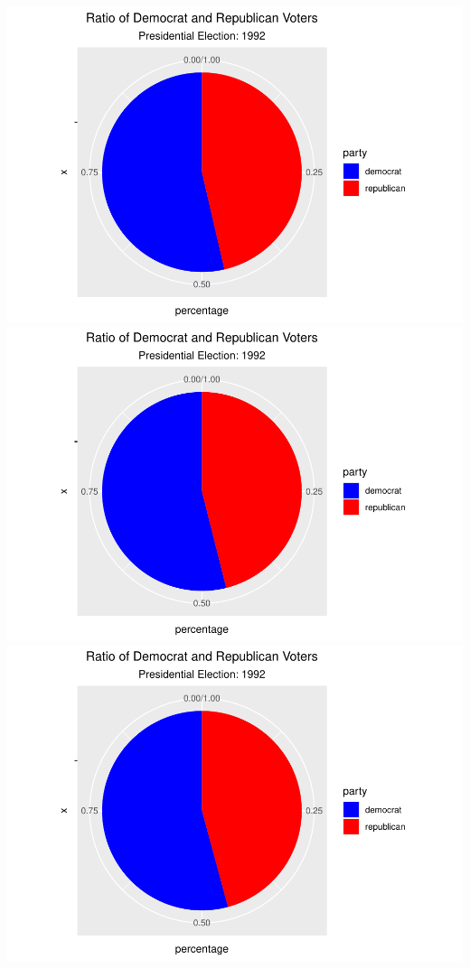 \documentclass[
]{article}
\begin{document}
\includegraphics{election_files/figure-latex/anim-43.pdf}
\includegraphics{election_files/figure-latex/anim-44.pdf}
\includegraphics{election_files/figure-latex/anim-45.pdf}
\end{document}
